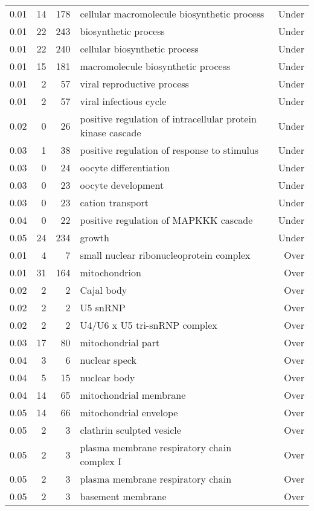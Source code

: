 \begin{longtable}{rrrp{7cm}r}
  0.01 &  14 & 178 & cellular macromolecule biosynthetic process & Under \\ 
  0.01 &  22 & 243 & biosynthetic process & Under \\ 
  0.01 &  22 & 240 & cellular biosynthetic process & Under \\ 
  0.01 &  15 & 181 & macromolecule biosynthetic process & Under \\ 
  0.01 &   2 &  57 & viral reproductive process & Under \\ 
  0.01 &   2 &  57 & viral infectious cycle & Under \\ 
  0.02 &   0 &  26 & positive regulation of intracellular protein kinase cascade & Under \\ 
  0.03 &   1 &  38 & positive regulation of response to stimulus & Under \\ 
  0.03 &   0 &  24 & oocyte differentiation & Under \\ 
  0.03 &   0 &  23 & oocyte development & Under \\ 
  0.03 &   0 &  23 & cation transport & Under \\ 
  0.04 &   0 &  22 & positive regulation of MAPKKK cascade & Under \\ 
  0.05 &  24 & 234 & growth & Under \\ 
   \hline
0.01 &   4 &   7 & small nuclear ribonucleoprotein complex & Over \\ 
  0.01 &  31 & 164 & mitochondrion & Over \\ 
  0.02 &   2 &   2 & Cajal body & Over \\ 
  0.02 &   2 &   2 & U5 snRNP & Over \\ 
  0.02 &   2 &   2 & U4/U6 x U5 tri-snRNP complex & Over \\ 
  0.03 &  17 &  80 & mitochondrial part & Over \\ 
  0.04 &   3 &   6 & nuclear speck & Over \\ 
  0.04 &   5 &  15 & nuclear body & Over \\ 
  0.04 &  14 &  65 & mitochondrial membrane & Over \\ 
  0.05 &  14 &  66 & mitochondrial envelope & Over \\ 
  0.05 &   2 &   3 & clathrin sculpted vesicle & Over \\ 
  0.05 &   2 &   3 & plasma membrane respiratory chain complex I & Over \\ 
  0.05 &   2 &   3 & plasma membrane respiratory chain & Over \\ 
  0.05 &   2 &   3 & basement membrane & Over \\ 

\end{longtable}
